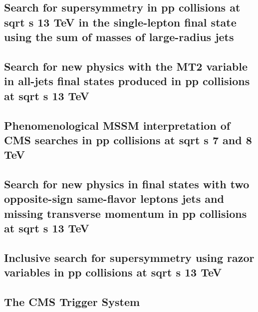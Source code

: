 \documentclass[a4paper, 11pt, twoside, openright]{report}
\begin{document}
\subsection{Search for supersymmetry in pp collisions at sqrt s 13 TeV in the single-lepton final state using the sum of masses of large-radius jets}


\subsection{Search for new physics with the MT2 variable in all-jets final states produced in pp collisions at sqrt s 13 TeV}


\subsection{Phenomenological MSSM interpretation of CMS searches in pp collisions at sqrt s 7 and 8 TeV}


\subsection{Search for new physics in final states with two opposite-sign same-flavor leptons jets and missing transverse momentum in pp collisions at sqrt s 13 TeV}


\subsection{Inclusive search for supersymmetry using razor variables in pp collisions at  sqrt s 13 TeV}


\subsection{The CMS Trigger System}

\end{document}
